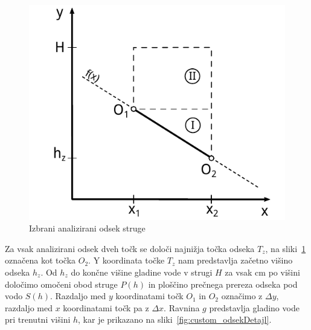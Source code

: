 \begin{figure}[H]
	\begin{centering}
		\includegraphics{slike/customChannel/odsek.pdf}
		\caption{Izbrani analizirani odsek struge} \label{fig:odsekStruge}
	\end{centering}
\end{figure}








Za vsak analizirani odsek dveh točk se določi najnižja točka odseka $T_z$, na sliki~\ref{fig:odsekStruge} označena kot točka $O_2$. Y koordinata točke $T_z$ nam predstavlja začetno višino odseka $h_{z}$. Od $h_z$ do končne višine gladine vode v strugi $H$ za vsak cm po višini določimo omočeni obod struge $P(h)$ in ploščino prečnega prereza odseka pod vodo $S(h)$. Razdaljo med $y$ koordinatami točk $O_1$ in $O_2$ označimo z $\Delta y$, razdaljo med $x$ koordinatami točk pa z $\Delta x$.  Ravnina $g$ predstavlja gladino vode pri trenutni višini $h$, kar je prikazano na sliki~\ref{fig:custom_odsekDetajl}.


